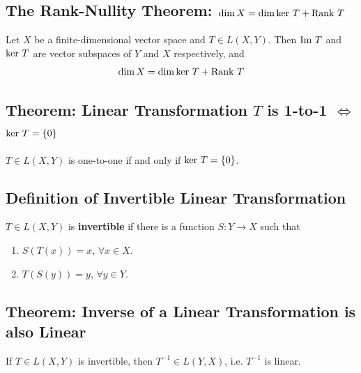 \documentclass[11pt]{elegantbook}
\begin{document}
\subsection{The Rank-Nullity Theorem: $\dim X=\dim\textnormal{ker }T+\textnormal{Rank }T$}
\begin{theorem}
    Let $X$ be a finite-dimensional vector space and $T \in L(X, Y)$. Then $\textnormal{Im }T$ and $\textnormal{ker }T$ are vector subspaces of $Y$ and $X$ respectively, and
    $$\dim X=\dim\textnormal{ker }T+\textnormal{Rank }T$$
\end{theorem}


\subsection{Theorem: Linear Transformation $T$ is 1-to-1 $\Leftrightarrow$ $\textnormal{ker }T = \{0\}$}
\begin{theorem}[1-to-1 $\Leftrightarrow$ $\textnormal{ker }T = \{0\}$]
    $T \in L(X, Y)$ is one-to-one if and only if $\textnormal{ker }T = \{0\}$.
\end{theorem}


\subsection{Definition of Invertible Linear Transformation}
\begin{definition}
    \normalfont
    $T \in L(X, Y)$ is \textbf{invertible} if there is a function $S : Y \rightarrow X$ such that
    \begin{enumerate}
        \item $S(T(x))=x$, $\forall x\in X$.
        \item $T(S(y))=y$, $\forall y\in Y$.
    \end{enumerate}
\end{definition}

\subsection{Theorem: Inverse of a Linear Transformation is also Linear}
\begin{theorem}
    If $T \in L(X, Y)$ is invertible, then $T^{-1} \in L(Y, X)$, i.e. $T^{-1}$ is linear.
\end{theorem}
\end{document}
